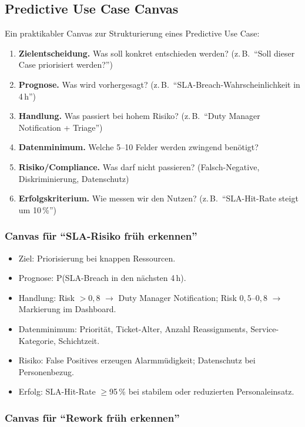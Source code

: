 \documentclass[11pt,a4paper,oneside]{article}
\begin{document}
\subsection{Predictive Use Case Canvas}

Ein praktikabler Canvas zur Strukturierung eines Predictive Use Case:

\begin{enumerate}
  \item \textbf{Zielentscheidung.} Was soll konkret entschieden werden? (z.\,B.\ ``Soll dieser Case priorisiert werden?'')
  \item \textbf{Prognose.} Was wird vorhergesagt? (z.\,B.\ ``SLA-Breach-Wahrscheinlichkeit in 4\,h'')
  \item \textbf{Handlung.} Was passiert bei hohem Risiko? (z.\,B.\ ``Duty Manager Notification + Triage'')
  \item \textbf{Datenminimum.} Welche 5--10 Felder werden zwingend benötigt?
  \item \textbf{Risiko/Compliance.} Was darf nicht passieren? (Falsch-Negative, Diskriminierung, Datenschutz)
  \item \textbf{Erfolgskriterium.} Wie messen wir den Nutzen? (z.\,B.\ ``SLA-Hit-Rate steigt um 10\,\%'')
\end{enumerate}

\subsubsection{Canvas für ``SLA-Risiko früh erkennen''}

\begin{itemize}
  \item Ziel: Priorisierung bei knappen Ressourcen.
  \item Prognose: P(SLA-Breach in den nächsten 4\,h).
  \item Handlung: Risk $>0,8$ $\rightarrow$ Duty Manager Notification; Risk $0,5$--$0,8$ $\rightarrow$ Markierung im Dashboard.
  \item Datenminimum: Priorität, Ticket-Alter, Anzahl Reassignments, Service-Kategorie, Schichtzeit.
  \item Risiko: False Positives erzeugen Alarmmüdigkeit; Datenschutz bei Personenbezug.
  \item Erfolg: SLA-Hit-Rate $\geq$95\,\% bei stabilem oder reduzierten Personaleinsatz.
\end{itemize}

\subsubsection{Canvas für ``Rework früh erkennen''}
\end{document}
